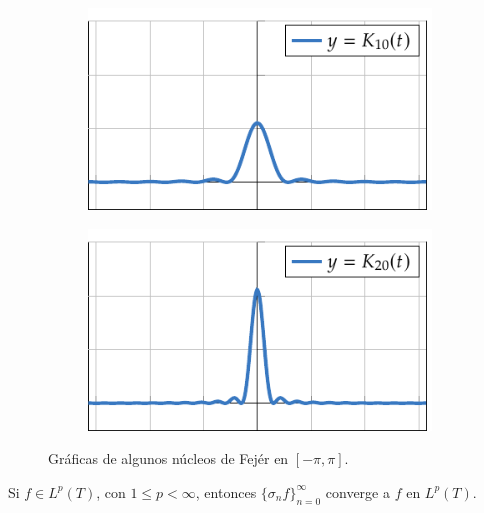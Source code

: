 \documentclass[a4paper, 11pt, oneside]{report}
\begin{document}
\begin{figure}[H]
  \centering
  \begin{subfigure}[b]{0.49\textwidth}
    \centering
    \includegraphics{./plot21/main.pdf}
  \end{subfigure}
  \begin{subfigure}[b]{0.49\textwidth}
    \centering
    \includegraphics{./plot22/main.pdf}
  \end{subfigure}
  \caption{Gráficas de algunos núcleos de Fejér en $[-\pi,\pi]$.}
\end{figure}

\begin{theorem}\label{teo:4.3.5}
  Si $f \in L^p(T)$, con $1 \leq p < \infty$, entonces $\{\sigma_nf\}_{n=0}^\infty$ converge a $f$ en $L^p(T)$.
\end{theorem}
\end{document}
